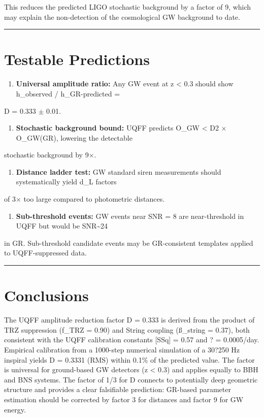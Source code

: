 \documentclass[12pt,a4paper]{article}
\begin{document}
This reduces the predicted LIGO stochastic background by a factor of 9, which may explain the non-detection of the cosmological GW background to date.

\medskip\hrule\medskip

\section{Testable Predictions}

\begin{enumerate}
  \item \textbf{Universal amplitude ratio:} Any GW event at z < 0.3 should show h\_observed / h\_GR-predicted =
\end{enumerate}

D = 0.333 $\pm$ 0.01.

\begin{enumerate}
  \item \textbf{Stochastic background bound:} UQFF predicts O\_GW < D2 $\times$ O\_GW(GR), lowering the detectable
\end{enumerate}

stochastic background by 9$\times$.

\begin{enumerate}
  \item \textbf{Distance ladder test:} GW standard siren measurements should systematically yield d\_L factors
\end{enumerate}

of 3$\times$ too large compared to photometric distances.

\begin{enumerate}
  \item \textbf{Sub-threshold events:} GW events near SNR = 8 are near-threshold in UQFF but would be SNR\textasciitilde{}24
\end{enumerate}

in GR. Sub-threshold candidate events may be GR-consistent templates applied to UQFF-suppressed data.

\medskip\hrule\medskip

\section{Conclusions}

The UQFF amplitude reduction factor D = 0.333 is derived from the product of TRZ suppression (f\_TRZ = 0.90) and String coupling (\ss{}\_string = 0.37), both consistent with the UQFF calibration constants [SSq] = 0.57 and ? = 0.0005/day. Empirical calibration from a 1000-step numerical simulation of a 30?250 Hz inspiral yields D = 0.3331 (RMS) within 0.1\% of the predicted value. The factor is universal for ground-based GW detectors (z < 0.3) and applies equally to BBH and BNS systems. The factor of 1/3 for D connects to potentially deep geometric structure and provides a clear falsifiable prediction: GR-based parameter estimation should be corrected by factor 3 for distances and factor 9 for GW energy.
\end{document}
